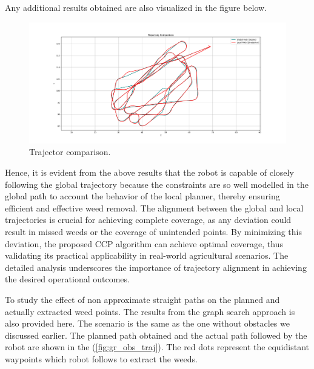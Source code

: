Any additional results obtained are also visualized in the figure below.
\begin{figure}[htbp]
    \centering
    \includegraphics[width=\textwidth]{Images/real_robot/obs_compare.png}
    \caption{Trajector comparison.}
    \label{fig:traj_compare}
\end{figure}


Hence, it is evident from the above results that the robot is capable of closely following the global trajectory because the constraints are so well modelled in the global path to account the behavior of the local planner, thereby ensuring efficient and effective weed removal. The alignment between the global and local trajectories is crucial for achieving complete coverage, as any deviation could result in missed weeds or the coverage of unintended points. By minimizing this deviation, the proposed CCP algorithm can achieve optimal coverage, thus validating its practical applicability in real-world agricultural scenarios. The detailed analysis underscores the importance of trajectory alignment in achieving the desired operational outcomes.

\vspace*{6mm}   

To study the effect of non approximate straight paths on the planned and actually extracted weed points. The results from the graph search approach is also provided here. The scenario is the same as the one without obstacles we discussed earlier. The planned path obtained and the actual path followed by the robot are shown in the (\autoref{fig:gr_obs_traj}). The red dots represent the equidistant waypoints which robot follows to extract the weeds.


